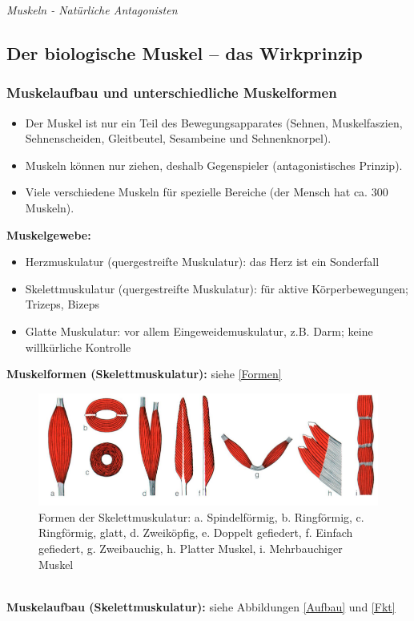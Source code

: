 \emph{Muskeln - Natürliche Antagonisten}

\subsection{Der biologische Muskel – das Wirkprinzip}
\subsubsection{Muskelaufbau und unterschiedliche Muskelformen}
\begin{itemize}
	\item Der Muskel ist nur ein Teil des Bewegungsapparates (Sehnen, Muskelfaszien, Sehnenscheiden, Gleitbeutel, Sesambeine und Sehnenknorpel).
	\item Muskeln können nur ziehen, deshalb Gegenspieler (antagonistisches Prinzip).
	\item Viele verschiedene Muskeln für spezielle Bereiche (der Mensch hat ca. 300 Muskeln).
\end{itemize}
\textbf{Muskelgewebe:}
\begin{itemize}
	\item Herzmuskulatur (quergestreifte Muskulatur): das Herz ist ein Sonderfall
	\item Skelettmuskulatur (quergestreifte Muskulatur): für aktive Körperbewegungen; Trizeps, Bizeps
	\item Glatte Muskulatur: vor allem Eingeweidemuskulatur, z.B. Darm; keine willkürliche Kontrolle
\end{itemize}
\textbf{Muskelformen (Skelettmuskulatur):} siehe \autoref{Formen}\\
\begin{figure}[h!]
	\centering
		\includegraphics[width=0.7\linewidth]{figures/ch03_muskeln.png}
		\caption{Formen der Skelettmuskulatur: a. Spindelförmig, b. Ringförmig, c. Ringförmig, glatt, d. Zweiköpfig, e. Doppelt gefiedert, f. Einfach gefiedert, g. Zweibauchig, h. Platter Muskel, i. 					Mehrbauchiger Muskel}
	\label{Formen}
\end{figure}\\
\textbf{Muskelaufbau (Skelettmuskulatur):} siehe Abbildungen \ref{Aufbau} und \ref{Fkt}
